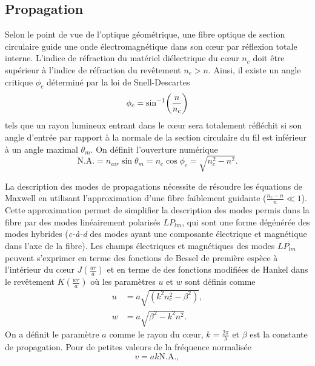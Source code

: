 \documentclass[10pt,letterpaper,twocolumn]{article}
\DeclarePairedDelimiter\autobracket{(}{)}
\newcommand{\br}[1]{\autobracket*{#1}}
\newcommand{\na}{\text{N.A.}}
\begin{document}
\subsection{Propagation}\label{sec:thProp}
Selon le point de vue de l'optique géométrique, une fibre optique de section circulaire guide une onde électromagnétique dans son c\oe{}ur par réflexion totale interne. L'indice de réfraction du matériel diélectrique du c\oe{}ur $n_c$ doit être supérieur à l'indice de réfraction du revêtement $n_c > n$. Ainsi, il existe un angle critique $\phi_c$ déterminé par la loi de Snell-Descartes
\begin{equation}\label{eq:angleCritique}
	\phi_c = \sin^{-1}\br{\frac{n}{n_c}}
\end{equation}
tels que un rayon lumineux entrant dans le c\oe{}ur sera totalement réfléchit si son angle d'entrée par rapport à la normale de la section circulaire du fil est inférieur à un angle maximal $\theta_m$. On définit l'ouverture numérique\supercite{Pedrotti}
\begin{equation}\label{eq:nath}
	\na = n_{air} \sin \theta_m = n_c\cos \phi_c = \sqrt{n_c^2 - n^2}.
\end{equation}\par
La description des modes de propagations nécessite de résoudre les équations de Maxwell en utilisant l'approximation d'une fibre faiblement guidante\supercite{Snitzer1961,Gloge1971} ($\frac{n_c - n}{n} \ll 1$). Cette approximation permet de simplifier la description des modes permis dans la fibre par des modes linéairement polarisés $LP_{lm}$, qui sont une forme dégénérée des modes hybrides (\textit{c-à-d} des modes ayant une composante électrique et magnétique dans l'axe de la fibre).
Les champs électriques et magnétiques des modes $LP_{lm}$ peuvent s'exprimer en terme des fonctions de Bessel de première espèce à l'intérieur du c\oe{}ur $J(\frac{ur}{a})$  et en terme de des fonctions modifiées de Hankel dans le revêtement $K(\frac{wr}{a})$ où les paramètres $u$ et $w$ sont définis comme
\begin{align}
	u &= a\sqrt{(k^2n_c^2 - \beta^2)}, \\
	w &= a\sqrt{\beta^2 - k^2n^2}.
\end{align}
On a définit le paramètre $a$ comme le rayon du c\oe{}ur, $k = \frac{2\pi}{\lambda}$ et $\beta$ est la constante de propagation. Pour de petites valeurs de la fréquence normalisée\supercite{Gloge1971}
\begin{equation}\label{eq:V}
	v = ak\na,
\end{equation}
\end{document}
